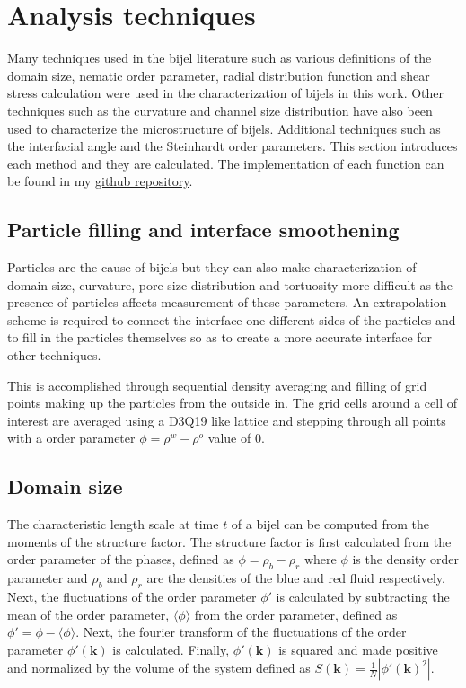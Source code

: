 \section{Analysis techniques}

Many techniques used in the bijel literature such as various definitions of the domain size,
nematic order parameter, radial distribution function and shear stress calculation were used in the characterization
of bijels in this work. \cite{kendon_inertial_2001, jansen_bijels_2011, gunther_timescales_2014} Other techniques such
as the curvature and channel size distribution have also been used to characterize the microstructure of bijels. 
\cite{reeves_quantitative_2016,chan_channel_2012} Additional techniques such as the interfacial angle
and the Steinhardt order parameters. \cite{karthikeyan_formation_2024,steinhardt_bond-orientational_1983, mickel_shortcomings_2013}
This section introduces each method and they are calculated. The implementation of each function can be found in my 
\href{https://github.com/nkarthi95/schiller_lab_tools}{github repository}.


\subsection{Particle filling and interface smoothening}
\label{section:filling_routine}

Particles are the cause of bijels but they can also make characterization of domain size, curvature, pore size 
distribution and tortuosity more difficult as the presence of particles affects measurement of these parameters. 
An extrapolation scheme is 
required to connect the interface one different sides of the particles and to fill in the particles themselves so 
as to create a more accurate interface for other techniques.

This is accomplished through sequential density averaging and filling of grid points making up the particles from 
the outside in. The grid cells around a cell of interest are averaged using a D3Q19 like lattice and stepping through 
all points with a order parameter $\phi = \rho^w - \rho^o$ value of 0. 

\subsection{Domain size}
\label{section:domain_size}

The characteristic length scale at time $t$ of a bijel can be computed from the moments of the structure factor. The 
structure factor is first calculated from the order parameter of the phases, defined as $\phi = \rho_b - \rho_r$ where 
$\phi$ is the density order parameter and $\rho_b$ and $\rho_r$ are the densities of the blue and red fluid respectively. 
Next, the fluctuations of the order parameter $\phi'$ is calculated by subtracting the mean of the order parameter, 
$\langle \phi \rangle$ from the order parameter, defined as $\phi' = \phi - \langle \phi \rangle$. Next, the fourier 
transform of the fluctuations of the order parameter $\phi'(\mathbf{k})$ is calculated. Finally, $\phi'(\mathbf{k})$ 
is squared and made positive and normalized by the volume of the system defined as 
$S(\mathbf{k}) = \frac{1}{N} |\phi'(\mathbf{k})^2|$.

